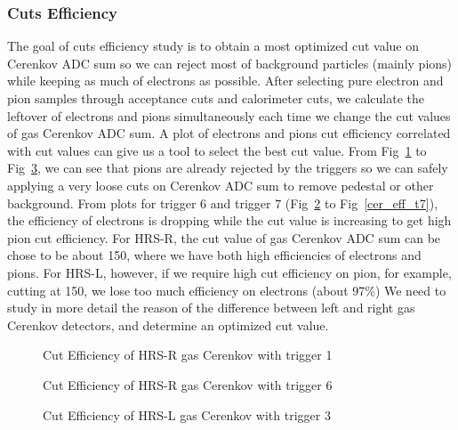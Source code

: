 \subsubsection{Cuts Efficiency}
  The goal of cuts efficiency study is to obtain a most optimized cut value on Cerenkov ADC sum so we can reject most of background particles (mainly pions) while keeping as much of electrons as possible. After selecting pure electron and pion samples through acceptance cuts and calorimeter cuts, we calculate the leftover of electrons and pions simultaneously each time we change the cut values of gas Cerenkov ADC sum. A plot of electrons and pions cut efficiency correlated with cut values can give us a tool to select the best cut value. From Fig~\ref{cer_eff_t1} to Fig~\ref{cer_eff_t3}, we can see that pions are already rejected by the triggers so we can safely applying a very loose cuts on Cerenkov ADC sum to remove pedestal or other background. From plots for trigger 6 and trigger 7 (Fig~\ref{cer_eff_t6} to Fig~\ref{cer_eff_t7}), the efficiency of electrons is dropping while the cut value is increasing to get high pion cut efficiency. For HRS-R, the cut value of gas Cerenkov ADC sum can be chose to be about 150, where we have both high efficiencies of electrons and pions. For HRS-L, however, if we require high cut efficiency on pion, for example, cutting at 150, we lose too much efficiency on electrons (about 97\%)  We need to study in more detail the reason of the difference between left and right gas Cerenkov detectors, and determine an optimized cut value.

 \begin{figure}[htb]
 \centerline{}
 \caption[Cut Efficiency of HRS-R gas Cerenkov with trigger 1 ]{\footnotesize{Cut Efficiency of HRS-R gas Cerenkov with trigger 1}
 \label{cer_eff_t1}}
 \end{figure}

 \begin{figure}[htb]
 \centerline{}
 \caption[Cut Efficiency of HRS-R gas Cerenkov with trigger 6 ]{\footnotesize{Cut Efficiency of HRS-R gas Cerenkov with trigger 6}
 \label{cer_eff_t6}}
 \end{figure}

 \begin{figure}[htb]
 \centerline{}
 \caption[Cut Efficiency of HRS-L gas Cerenkov with trigger 3 ]{\footnotesize{Cut Efficiency of HRS-L gas Cerenkov with trigger 3}
 \label{cer_eff_t3}}
 \end{figure}

